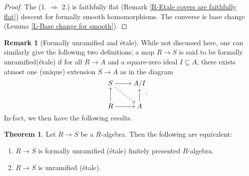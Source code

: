\documentclass[letterpaper,10pt,twoside]{amsart}
\theoremstyle{proposition}
\theoremstyle{definition}
\theoremstyle{theorem}
\newtheorem{theorem}[proposition]{Theorem}
\theoremstyle{definition}
\newtheorem{remark}[proposition]{\textbf{Remark}}
\theoremstyle{definition}
\theoremstyle{definition}
\theoremstyle{lemma}
\theoremstyle{definition}
\theoremstyle{definition}
\theoremstyle{corollary}
\theoremstyle{definition}
\begin{document}
	\begin{proof}
		The (1. $\Rightarrow$ 2.) is faithfully flat (Remark \ref{R-Etale covers are faithfully flat}) descent for formally smooth homomorphisms. The converse is base change (Lemma \ref{L-Base change for smooth}).
	\end{proof}
	\begin{remark}[Formally unramified and \'etale]\label{R-Formally unramified and etale}
		While not discussed here, one can similarly give the following two definitions; a map $R\to S$ is said to be formally unramified(\'etale) if for all $R\to A$ and a square-zero ideal $I \subseteq A$, there exists atmost one (unique) extension $S\to A$ as in the diagram
		\[\begin{tikzcd}[cramped]
			S & {A/I} \\
			R & A
			\arrow[from=1-1, to=1-2]
			\arrow[dashed, from=1-1, to=2-2]
			\arrow[from=2-1, to=1-1]
			\arrow[from=2-1, to=2-2]
			\arrow[from=2-2, to=1-2]
		\end{tikzcd}.\]
		In-fact, we then have the following results.
 	\end{remark}
	\begin{theorem}
		Let $R\to S$ be a $R$-algebra. Then the following are equivalent:
		\begin{enumerate}
			\item {$R\to S$ is  formally unramified (\'etale) finitely presented $R$-algebra.}
			\item {$R\to S$ is unramified (\'etale).}
		\end{enumerate}
	\end{theorem}
	
\end{document}
